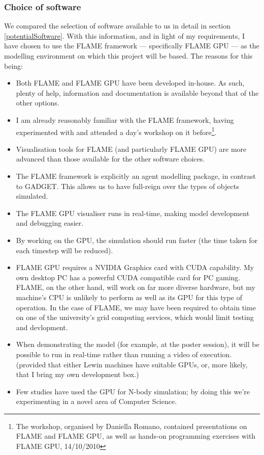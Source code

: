 \documentclass[11pt,a4paper]{article}
\begin{document}
\subsubsection{Choice of software}
We compared the selection of software available to us in detail in section \ref{potentialSoftware}. With this information, and in light of my requirements, I have chosen to use the FLAME framework --- specifically FLAME GPU --- as the modelling environment on which this project will be based. The reasons for this being:
\begin{itemize}
\item Both FLAME and FLAME GPU have been developed in-house. As such, plenty of help, information and documentation is available beyond that of the other options.
\item I am already reasonably familiar with the FLAME framework, having experimented with and attended a day's workshop on it before\footnote{The workshop, organised by Daniella Romano, contained presentations on FLAME and FLAME GPU, as well as hands-on programming exercises with FLAME GPU, 14/10/2010}.
\item Visualisation tools for FLAME (and particularly FLAME GPU) are more advanced than those available for the other software choices.
\item The FLAME framework is explicitly an agent modelling package, in contrast to GADGET. This allows us to have full-reign over the types of objects simulated.
\item The FLAME GPU visualiser runs in real-time, making model development and debugging easier.
\item By working on the GPU, the simulation should run faster (the time taken for each timestep will be reduced).
\item FLAME GPU requires a NVIDIA Graphics card with CUDA capability. My own desktop PC has a powerful CUDA compatible card for PC gaming. FLAME, on the other hand, will work on far more diverse hardware, but my machine's CPU is unlikely to perform as well as its GPU for this type of operation. In the case of FLAME, we may have been required to obtain time on one of the university's grid computing services, which would limit testing and devlopment.
\item When demonstrating the model (for example, at the poster session), it will be possible to run in real-time rather than running a video of execution. (provided that either Lewin machines have suitable GPUs, or, more likely, that I bring my own development box.)
\item Few studies have used the GPU for N-body simulation; by doing this we're experimenting in a novel area of Computer Science.
\end{itemize}
\end{document}
